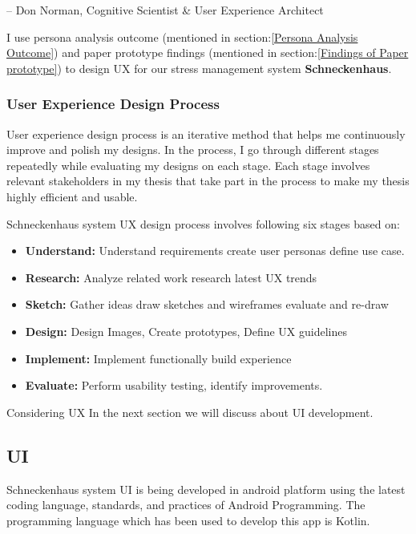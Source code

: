 – Don Norman, Cognitive Scientist \& User Experience Architect \citep{Norman1988TheThings}

I use persona analysis outcome (mentioned in section:\ref{Persona Analysis Outcome}) and paper prototype findings (mentioned in section:\ref{Findings of Paper prototype}) to design \acf{UX}  for our stress management system \textbf{Schneckenhaus}. 

\subsubsection*{User Experience Design Process}
User experience design process is an iterative method that helps me continuously improve and polish my designs. In the process, I go through different stages repeatedly while evaluating my designs on each stage. Each stage involves relevant stakeholders in my thesis that take part in the process to make my thesis highly efficient and usable.

Schneckenhaus system UX design process involves following six stages based on: \citep{Minhas2018UserPlanet}

\begin{itemize}
    \item \textbf{Understand:} Understand requirements create user personas define use case.
    \item \textbf{Research:} Analyze related work research latest UX trends
    \item \textbf{Sketch:} Gather ideas draw sketches and wireframes evaluate and re-draw
    \item \textbf{Design:} Design Images, Create prototypes, Define UX guidelines
    \item \textbf{Implement:} Implement functionally build experience
    \item \textbf{Evaluate:} Perform usability testing, identify improvements.
\end{itemize}

Considering \acf{UX} In the next section we will discuss about \acf{UI} development.

\subsection*{\acf{UI}}
Schneckenhaus  system UI is being developed in android platform using the latest coding language, standards, and practices of Android Programming. The programming language which  has been used to develop this app is Kotlin. 

